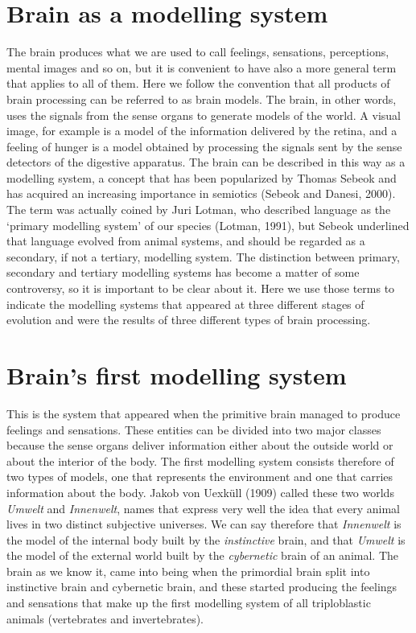 \documentclass[12pt]{article}
\begin{document}
\section{Brain as a modelling system}
The brain produces what we are used to call feelings, sensations, perceptions, mental images and so on, but it is convenient to have also a more general term that applies to all of them. Here we follow the convention that all products of brain processing can be referred to as brain models. The brain, in other words, uses the signals from the sense organs to generate models of the world. A visual image, for example is a model of the information delivered by the retina, and a feeling of hunger is a model obtained by processing the signals sent by the sense detectors of the digestive apparatus. The brain can be described in this way as a modelling system, a concept that has been popularized by Thomas Sebeok and has acquired an increasing importance in semiotics (Sebeok and Danesi, 2000). The term was actually coined by Juri Lotman, who described language as the `primary modelling system' of our species (Lotman, 1991), but Sebeok underlined that language evolved from animal systems, and should be regarded as a secondary, if not a tertiary, modelling system. The distinction between primary, secondary and tertiary modelling systems has become a matter of some controversy, so it is important to be clear about it. Here we use those terms to indicate the modelling systems that appeared at three different stages of evolution and were the results of three different types of brain processing. 


\section{Brain's first modelling system}
This is the system that appeared when the primitive brain managed to produce feelings and sensations. These entities can be divided into two major classes because the sense organs deliver information either about the outside world or about the interior of the body. The first modelling system consists therefore of two types of models, one that represents the environment and one that carries information about the body. Jakob von Uexküll (1909) called these two worlds \textit{Umwelt} and \textit{Innenwelt}, names that express very well the idea that every animal lives in two distinct subjective universes. We can say therefore that \textit{Innenwelt} is the model of the internal body built by the \textit{instinctive} brain, and that \textit{Umwelt} is the model of the external world built by the \textit{cybernetic} brain of an animal. The brain as we know it, came into being when the primordial brain split into instinctive brain and cybernetic brain, and these started producing the feelings and sensations that make up the first modelling system of all triploblastic animals (vertebrates and invertebrates). 
\end{document}
